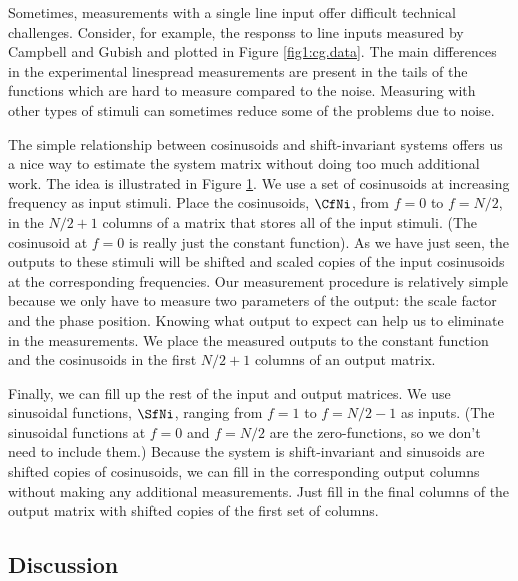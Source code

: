 Sometimes, measurements with a single line input
offer difficult technical challenges.
Consider, for example, the responss
to line inputs measured by Campbell and Gubish
and plotted in Figure \ref{fig1:cg.data}.
The main differences in the experimental linespread measurements
are present in the tails of the functions
which are hard to measure compared to the noise.
Measuring with other types of stimuli can sometimes
reduce some of the problems due to noise.

\begin{figure}
\centerline {
}
\caption[]{}
\label{fig1:sinResp}
\end{figure}
The simple relationship between
cosinusoids and shift-invariant systems offers us
a nice way to estimate the system matrix without doing
too much additional work.
The idea is illustrated in Figure \ref{fig1:sinResp}.
We use a set of cosinusoids at increasing frequency as 
input stimuli.
Place the cosinusoids, $\CfNi$, 
from $f = 0$ to $f = {N / 2}$,
in the ${ N / 2 } + 1$ columns of
a matrix that stores all of the input stimuli.
(The cosinusoid at $f = 0$ is really just the constant function).
As we have just seen,
the outputs to these
stimuli will be shifted and scaled copies of the input cosinusoids
at the corresponding frequencies.
Our measurement procedure is relatively simple
because we only have to measure two parameters of the
output:  the scale factor and the phase position.
Knowing what output to expect can help
us to eliminate in the  measurements.
We place the measured outputs to the constant
function and the cosinusoids in the first 
${N / 2 } + 1$ columns of an output matrix.

Finally, we can fill up the rest of the input and output
matrices.
We use sinusoidal functions, $\SfNi$,
ranging from $f = 1$ to $f = {N / 2} - 1$ as inputs.
(The sinusoidal functions at $f = 0$ and $f = {N / 2 }$ are the
zero-functions, so we don't need to include them.)
Because the system is shift-invariant and sinusoids are shifted
copies of cosinusoids, we can fill in the corresponding output columns
without making any additional measurements.
Just fill in the final columns of the output matrix with shifted copies
of the first set of columns.



\subsection{Discussion}


